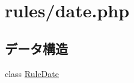 \hypertarget{date_8php}{
\section{rules/date.php}
\label{date_8php}
}
\subsection*{データ構造}
\begin{DoxyCompactItemize}
\item 
class \hyperlink{class_rule_date}{\-Rule\-Date}
\end{DoxyCompactItemize}
